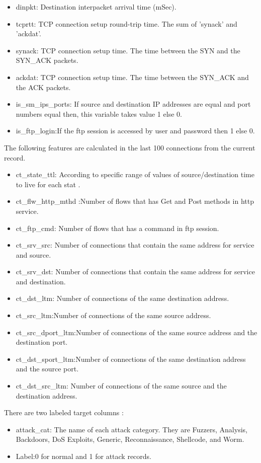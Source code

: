 \documentclass[14pt, conference]{IEEEtran}
\begin{document}
\begin{itemize}
\item dinpkt: Destination interpacket arrival time (mSec).
\item tcprtt: TCP connection setup round-trip time. The sum of ’synack’ and ’ackdat’.
\item synack: TCP connection setup time. The time between the SYN and the SYN\_ACK packets.
\item ackdat: TCP connection setup time. The time between the SYN\_ACK and the ACK packets.
\item is\_sm\_ips\_ports: If source and destination IP addresses are equal and port numbers equal then, this variable takes value 1 else 0.
\item is\_ftp\_login:If the ftp session is accessed by user and password then 1 else 0.

\end{itemize}

The following features are calculated in the last 100 connections from the current record.
\begin{itemize} 
\item ct\_state\_ttl: According to specific range of values of source/destination time to live for each stat .
\item ct\_flw\_http\_mthd :Number of flows that has  Get and Post methods in http service.

\item ct\_ftp\_cmd: Number of flows that has a command in ftp session.
\item ct\_srv\_src: Number of connections that contain the same address for service and source.
\item ct\_srv\_dst: Number of connections that contain the same address for service  and destination.
\item ct\_dst\_ltm: Number of connections of the same destination address.
\item ct\_src\_ltm:Number of connections of the same source address.
\item ct\_src\_dport\_ltm:Number of connections of the same source address and the destination port.
\item ct\_dst\_sport\_ltm:Number of connections of the same destination address and the source port.
\item ct\_dst\_src\_ltm: Number of connections of the same source and the destination address.
\end{itemize}

There are two labeled target columns :
\begin{itemize} 
    \item attack\_cat: The name of each attack category. They are Fuzzers, Analysis, Backdoors, DoS Exploits, Generic, Reconnaissance, Shellcode, and Worm.
 \item Label:0 for normal and 1 for attack records.
\end{itemize}
\end{document}
